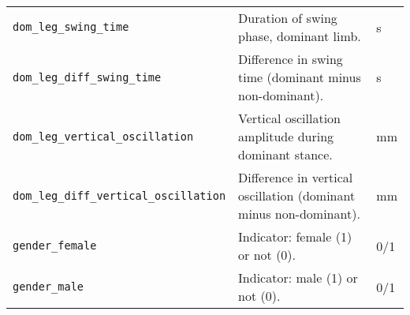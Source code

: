 {\begin{longtable}{@{}p{} p{} p{}@{}}
    \texttt{dom\_leg\_swing\_time} & Duration of swing phase, dominant limb. & s \\
    \texttt{dom\_leg\_diff\_swing\_time} & Difference in swing time (dominant minus non-dominant). & s \\
    \texttt{dom\_leg\_vertical\_oscillation} & Vertical oscillation amplitude during dominant stance. & mm \\
    \texttt{dom\_leg\_diff\_vertical\_oscillation} & Difference in vertical oscillation (dominant minus non-dominant). & mm \\
    \texttt{gender\_female} & Indicator: female (1) or not (0). & 0/1 \\
    \texttt{gender\_male} & Indicator: male (1) or not (0). & 0/1 \\
\end{longtable}
}


